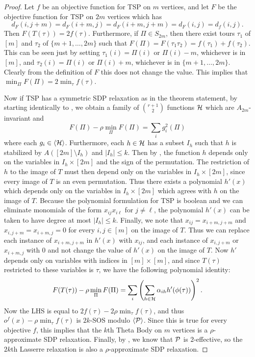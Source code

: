 \begin{proof}
Let $f$ be an objective function for \textsc{TSP} on $m$ vertices, and let $F$ be the objective function for \textsc{TSP} on $2m$ vertices which has 
\[d_F(i,j+m) = d_F(i+m, j) = d_F(i+m, j+m) = d_F(i,j) = d_f(i,j).\] 
Then $F(T(\tau)) = 2f(\tau)$. Furthermore, if $\Pi \in S_{2m}$, then there exist tours $\tau_1$ of $[m]$ and $\tau_2$ of $\{m+1,\dots,2m\}$ such that $F(\Pi) = F(\tau_1\tau_2) = f(\tau_1) + f(\tau_2)$. This can be seen just by setting $\tau_1(i) = \Pi(i)$ or $\Pi(i) - m$, whichever is in $[m]$, and $\tau_2(i) = \Pi(i)$ or $\Pi(i)+m$, whichever is in $\{m+1,\dots,2m\}$. Clearly from the definition of $F$ this does not change the value. This implies that $\min_\Pi F(\Pi) = 2\min_{\tau} f(\tau)$.

Now if \textsc{TSP} has a symmetric SDP relaxation as in the theorem statement, by starting identically to , we obtain a family of $\binom{r+1}{2}$ functions $\mathcal H$ which are $A_{2m}$-invariant and
\[F(\Pi) - \rho\min_{\Pi} F(\Pi) = \sum_i g_i^2(\Pi)\]
where each $g_i \in \langle \mathcal H \rangle$. Furthermore, each $h \in \mathcal H$ has a subset $I_h$ such that $h$ is stabilized by $A([2m] \setminus I_h)$ and $|I_h| \leq k$. Then by , the function $h$ depends only on the variables in $I_h \times [2m]$ and the sign of the permutation. The restriction of $h$ to the image of $T$ must then depend only on the variables in $I_h \times [2m]$, since every image of $T$ is an even permutation. Thus there exists a polynomial $h'(x)$ which depends only on the variables in $I_h \times [2m]$ which agrees with $h$ on the image of $T$. Because the polynomial formulation for \textsc{TSP} is boolean and we can eliminate monomials of the form $x_{ij}x_{i\ell}$ for $j \neq \ell$, the polynomial $h'(x)$ can be taken to have degree at most $|I_h| \leq k$. Finally, we note that $x_{ij} = x_{i+m,j+m}$ and $x_{i,j+m} = x_{i+m,j} = 0$ for every $i,j \in [m]$ on the image of $T$. Thus we can replace each instance of $x_{i+m,j+m}$ in $h'(x)$ with $x_{ij}$, and each instance of $x_{i,j+m}$ or $x_{i+m,j}$ with $0$ and not change the value of $h'(x)$ on the image of $T$. Now $h'$ depends only on variables with indices in $[m] \times [m]$, and since $T(\tau)$ restricted to these variables is $\tau$, we have the following polynomial identity:
\[F(T(\tau)) - \rho\min_{\Pi} F(\Pi) = \sum_i \left(\sum_{h \in \mathcal H} \alpha_{ih} h'(\phi(\tau))\right)^2.\]
Now the LHS is equal to $2f(\tau) - 2\rho \min_{\tau} f(\tau)$, and thus $o^f(x) - \rho \min_{\tau} f(\tau)$ is $2k$-SOS modulo $\langle \mathcal P \rangle$. Since this is true for every objective $f$, this implies that the $k$th Theta Body on $m$ vertices is a $\rho$-approximate SDP relaxation. Finally, by , we know that $\mathcal P$ is $2$-effective, so the $2k$th Lasserre relaxation is also a $\rho$-approximate SDP relaxation.
\end{proof}

